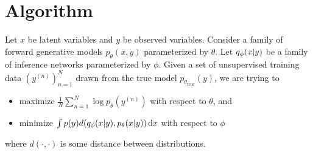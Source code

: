 
\section{Algorithm}
\label{sec:algorithm}

Let $x$ be latent variables and $y$ be observed variables.
Consider a family of forward generative models $p_{\theta}(x, y)$ parameterized by $\theta$.
Let $q_{\phi}(x \lvert y)$ be a family of inference networks parameterized by $\phi$.
Given a set of unsupervised training data $(y^{(n)})_{n = 1}^N$ drawn from the true model $p_{\theta_{\text{true}}}(y)$, we are trying to
\begin{itemize}
    \item maximize $\frac{1}{N} \sum_{n = 1}^N \log p_{\theta}(y^{(n)})$ with respect to $\theta$, and
    \item minimize $\int p(y) d(q_{\phi}(x \lvert y), p_{\theta}(x \lvert y)) \,\mathrm dx$ with respect to $\phi$
\end{itemize}
where $d(\cdot, \cdot)$ is some distance between distributions.

